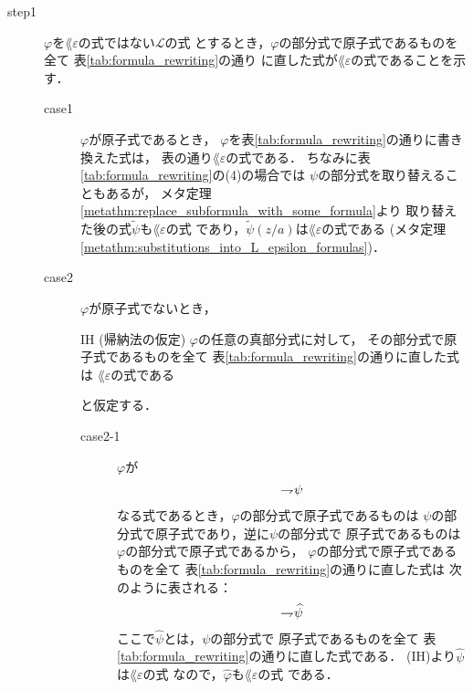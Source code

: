 	\begin{metaprf}\mbox{}
		\begin{description}
			\item[step1] $\varphi$を$\lang{\varepsilon}$の式ではない$\mathcal{L}$の式
				とするとき，$\varphi$の部分式で原子式であるものを全て
				表\ref{tab:formula_rewriting}の通り
				に直した式が$\lang{\varepsilon}$の式であることを示す．
				\begin{description}
					\item[case1] $\varphi$が原子式であるとき，
						$\varphi$を表\ref{tab:formula_rewriting}の通りに書き換えた式は，
						表の通り$\lang{\varepsilon}$の式である．
						ちなみに表\ref{tab:formula_rewriting}の(4)の場合では
						$\psi$の部分式を取り替えることもあるが，
						メタ定理\ref{metathm:replace_subformula_with_some_formula}より
						取り替えた後の式$\widetilde{\psi}$も$\lang{\varepsilon}$の式
						であり，$\widetilde{\psi}(z/a)$は$\lang{\varepsilon}$の式である
						(メタ定理\ref{metathm:substitutions_into_L_epsilon_formulas})．
						
					\item[case2] $\varphi$が原子式でないとき，
						\begin{itembox}[l]{IH (帰納法の仮定)}
							$\varphi$の任意の真部分式に対して，
							その部分式で原子式であるものを全て
							表\ref{tab:formula_rewriting}の通りに直した式は
							$\lang{\varepsilon}$の式である
						\end{itembox}
						と仮定する．
						\begin{description}
							\item[case2-1] $\varphi$が
								\begin{align}
									\rightharpoondown\hspace{-0.25em} \psi
								\end{align}
								なる式であるとき，$\varphi$の部分式で原子式であるものは
								$\psi$の部分式で原子式であり，逆に$\psi$の部分式で
								原子式であるものは$\varphi$の部分式で原子式であるから，
								$\varphi$の部分式で原子式であるものを全て
								表\ref{tab:formula_rewriting}の通りに直した式は
								次のように表される：
								\begin{align}
									\rightharpoondown\hspace{-0.25em} \widehat{\psi}
								\end{align}
								ここで$\widehat{\psi}$とは，$\psi$の部分式で
								原子式であるものを全て
								表\ref{tab:formula_rewriting}の通りに直した式である．
								(IH)より$\widehat{\psi}$は$\lang{\varepsilon}$の式
								なので，$\widehat{\varphi}$も$\lang{\varepsilon}$の式
								である．
								

\end{description}
\end{description}
\end{description}
\end{metaprf}
